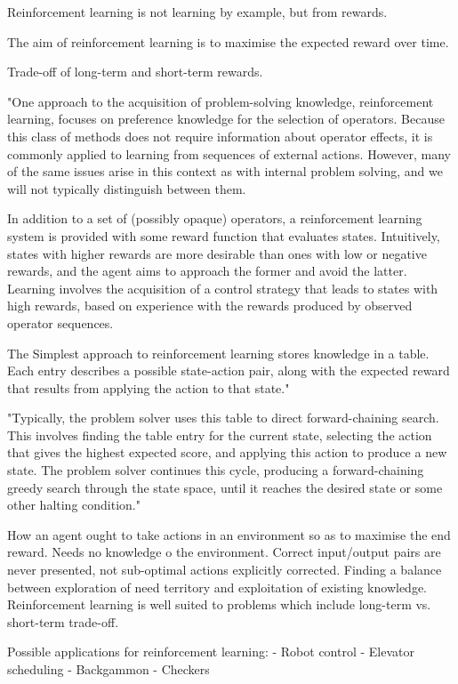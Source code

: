 \documentclass[a4paper,oneside]{report}
\begin{document}
Reinforcement learning is not learning by example, but from rewards.
 
The aim of reinforcement learning is to maximise the expected reward over time. 

Trade-off of long-term and short-term rewards. 

"One approach to the acquisition of problem-solving knowledge, reinforcement learning, focuses on preference knowledge for the selection of operators. Because this class of methods does not require information about operator effects, it is commonly applied to learning from sequences of external actions. However, many of the same issues arise in this context as with internal problem solving, and we will not typically distinguish between them.

In addition to a set of (possibly opaque) operators, a reinforcement learning system is provided with some reward function that evaluates states. Intuitively, states with higher rewards are more desirable than ones with low or negative rewards, and the agent aims to approach the former and avoid the latter. Learning involves the acquisition of a control strategy that leads to states with high rewards, based on experience with the rewards produced by observed operator sequences.

The Simplest approach to reinforcement learning stores knowledge in a table. Each entry describes a possible state-action pair, along with the expected reward that results from applying the action to that state."

"Typically, the problem solver uses this table to direct forward-chaining search. This involves finding the table entry for the current state, selecting the action that gives the highest expected score, and applying this action to produce a new state. The problem solver continues this cycle, producing a forward-chaining greedy search through the state space, until it reaches the desired state or some other halting condition."

How an agent ought to take actions in an environment so as to maximise the end reward. Needs no knowledge o the environment. Correct input/output pairs are never presented, not sub-optimal actions explicitly corrected. Finding a balance between exploration of need territory and exploitation of existing knowledge. Reinforcement learning is well suited to problems which include long-term vs. short-term trade-off. 

Possible applications for reinforcement learning:
-	Robot control
-	Elevator scheduling
-	Backgammon
-	Checkers
\end{document}
